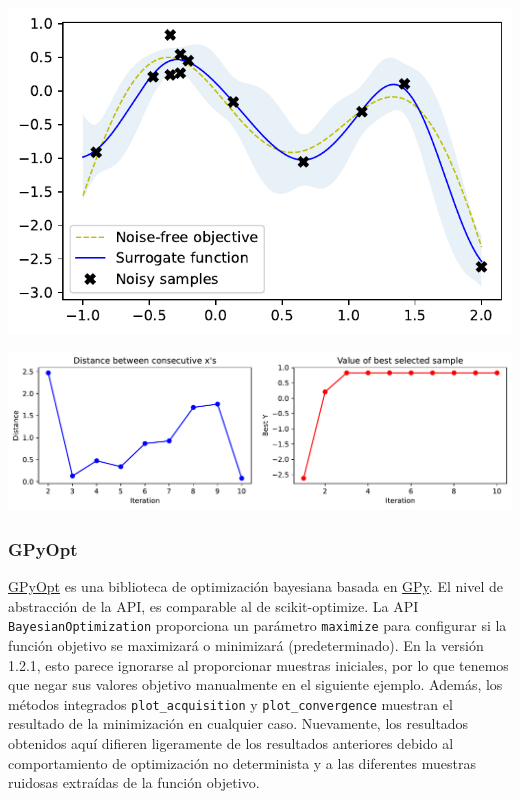 \documentclass[
  12pt,
  letterpaper,
  DIV=11,
  numbers=noendperiod]{scrartcl}
\begin{document}
\includegraphics{ProyFinal_OptBayesiana_2024_files/figure-pdf/cell-8-output-1.pdf}

\includegraphics{ProyFinal_OptBayesiana_2024_files/figure-pdf/cell-9-output-1.pdf}

\subsubsection{GPyOpt}\label{gpyopt}

\href{http://sheffieldml.github.io/GPyOpt/}{GPyOpt} es una biblioteca de
optimización bayesiana basada en
\href{https://sheffieldml.github.io/GPy/}{GPy}. El nivel de abstracción
de la API, es comparable al de scikit-optimize. La API
\texttt{BayesianOptimization} proporciona un parámetro \texttt{maximize}
para configurar si la función objetivo se maximizará o minimizará
(predeterminado). En la versión 1.2.1, esto parece ignorarse al
proporcionar muestras iniciales, por lo que tenemos que negar sus
valores objetivo manualmente en el siguiente ejemplo. Además, los
métodos integrados \texttt{plot\_acquisition} y
\texttt{plot\_convergence} muestran el resultado de la minimización en
cualquier caso. Nuevamente, los resultados obtenidos aquí difieren
ligeramente de los resultados anteriores debido al comportamiento de
optimización no determinista y a las diferentes muestras ruidosas
extraídas de la función objetivo.
\end{document}

